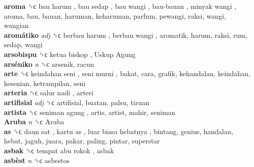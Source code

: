 \textbf{aroma} ␝ϲ   bau harum ,  bau sedap ,  bau wangi ,  bau-bauan ,  minyak wangi , aroma, bau, bauan, haruman, keharuman, parfum, pewangi, raksi, wangi, wangian  \\
\textbf{aromátiko} \emph{adj}  ␝ϲ   berbau harum ,  berbau wangi , aromatik, harum, raksi, rum, sedap, wangi  \\
\textbf{arsobispu} ␝ϲ   ketua biskop ,  Uskup Agung   \\
\textbf{arséniko} \emph{n}  ␝ϲ  arsenik, racun  \\
\textbf{arte} ␝ϲ   keindahan seni ,  seni murni , bakat, cara, grafik, kehandalan, keindahan, kesenian, ketrampilan, seni  \\
\textbf{arteria} ␝ϲ   salur nadi , arteri  \\
\textbf{artifisial} \emph{adj}  ␝ϲ  artifisial, buatan, palsu, tiruan  \\
\textbf{artista} ␝ϲ   seniman agung , artis, artist, mahir, seniman  \\
\textbf{Aruba} \emph{n}  ␝ϲ   Aruba   \\
\textbf{as} ␝ϲ   daun sat ,  kartu as ,  luar biasa hebatnya , bintang, genius, handalan, hebat, jaguh, juara, pakar, paling, pintar, superstar  \\
\textbf{asbak} ␝ϲ   tempat abu rokok , asbak  \\
\textbf{asbèst} \emph{n}  ␝ϲ  asbestos  \\
